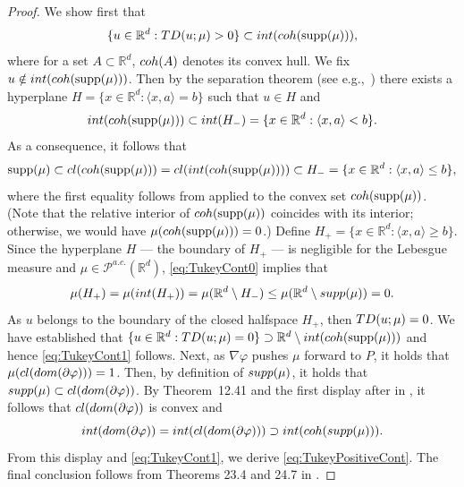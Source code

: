 \documentclass[11pt]{article}
\DeclareMathOperator{\supp}{supp}
\newcommand{\R}{\mathbb{R}}
\theoremstyle{plain}
\theoremstyle{definition}
\begin{document}
\begin{proof}%

We show first that
\begin{equation}
    \label{eq:TukeyCont1}
    \{u\in \R^d: 
    {\rm TD}(u;\mu)>0\}\subset {\rm int}({\rm coh} (\supp (\mu))),
\end{equation}
 {where for a set $A\subset \R^d$,  $ {\rm coh} (A)$ denotes its convex hull. We fix $u\notin {\rm int}({\rm coh} (\supp (\mu)))$. Then by the separation theorem (see e.g.,~\cite[Theorem~11.2]{Rockafellar.70}) there exists a hyperplane $ H=\{ x\in \R^d : \langle x, a\rangle=b\} $ such that $u\in H$ and  $$  {\rm int}({\rm coh} (\supp (\mu))) \subset {\rm int } (H_-)=\{ x\in \R^d : \langle x, a\rangle < b\}. $$ 
As a consequence, it follows that 
\begin{equation}
    \label{eq:TukeyCont0}
    \supp (\mu)\subset {\rm cl}({\rm coh} (\supp (\mu)))= {\rm cl}({\rm int}({\rm coh} (\supp (\mu)))) \subset H_- =\{ x\in \R^d : \langle x, a\rangle \leq  b\},
\end{equation}
where the first equality follows from \cite[Theorem~6.3]{Rockafellar.70} applied to the convex set \({\rm coh} (\supp (\mu))\). (Note that the relative interior of \({\rm coh} (\supp (\mu))\) coincides with its interior; otherwise, we would have \(\mu({\rm coh} (\supp (\mu))) = 0\).) Define  $H_+=\{ x\in \R^d : \langle x, a\rangle \geq b\}$. Since the hyperplane $H$  --- the boundary of $H_+$ --- is negligible for the Lebesgue measure and  $\mu\in \mathcal{P}^{a.c.}(\R^d)$,  \eqref{eq:TukeyCont0} implies that   
%
$$ \mu( H_+) = \mu ({\rm int}(H_+))= \mu (\R^d\setminus H_-) \leq \mu (\R^d\setminus {\rm supp}(\mu) )=0 .  $$
%
As $u $ belongs to the boundary  of the closed halfspace $H_+$, then $ {\rm TD}(u;\mu)=0$. We have established that $\{u\in \R^d: 
    {\rm TD}(u;\mu)=0\}\supset \mathbb{R}^d\setminus{\rm int}({\rm coh} (\supp (\mu)))$ and hence  \eqref{eq:TukeyCont1} follows. 
}
 Next, 
     as $\nabla \varphi$ pushes $\mu$  forward to $P$, it holds that  $\mu({\rm cl}({{\rm dom}(\partial \varphi)}))=1$. Then, by definition of ${\rm supp}(\mu)$, it holds that 
     ${\rm supp}(\mu)\subset {\rm cl}({{\rm dom}(\partial \varphi)})$.   
By Theorem~12.41 and the first display after in \cite{RockafellarWets.98}, it follows that ${\rm cl}({{\rm dom}(\partial \varphi)})$  is convex and 
$${\rm int}({{\rm dom}(\partial \varphi)}) = {\rm int}({\rm cl}({{\rm dom}(\partial \varphi)})) \supset {\rm int}({\rm coh}({\rm supp}(\mu))). $$
From this display and  
\eqref{eq:TukeyCont1}, we derive \eqref{eq:TukeyPositiveCont}. 
   The final conclusion follows from Theorems 23.4 and 24.7 in \cite{Rockafellar.70}. 
\end{proof}
\end{document}
